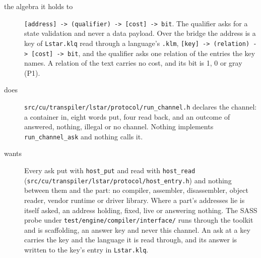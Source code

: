 \begin{description}
\item[{the algebra it holds to}] \texttt{[address] -\allowbreak{}> (qualifier) -\allowbreak{}> [cost] -\allowbreak{}> bit}. The qualifier asks for a state validation and never a data payload. Over the bridge the address is a key of \texttt{Lstar.\allowbreak{}klq} read through a language's \texttt{.\allowbreak{}klm}, \texttt{[key] -\allowbreak{}> (relation) -\allowbreak{}> [cost] -\allowbreak{}> bit}, and the qualifier asks one relation of the entries the key names. A relation of the text carries no cost, and its bit is 1, 0 or gray (P1).
\item[{does}] \texttt{src/\allowbreak{}cu/\allowbreak{}transpiler/\allowbreak{}lstar/\allowbreak{}protocol/\allowbreak{}run\_\allowbreak{}channel.\allowbreak{}h} declares the channel: a container in, eight words put, four read back, and an outcome of answered, nothing, illegal or no channel. Nothing implements \texttt{run\_\allowbreak{}channel\_\allowbreak{}ask} and nothing calls it.
\item[{wants}] Every ask put with \texttt{host\_\allowbreak{}put} and read with \texttt{host\_\allowbreak{}read} (\texttt{src/\allowbreak{}cu/\allowbreak{}transpiler/\allowbreak{}lstar/\allowbreak{}protocol/\allowbreak{}host\_\allowbreak{}entry.\allowbreak{}h}) and nothing between them and the part: no compiler, assembler, disassembler, object reader, vendor runtime or driver library. Where a part's addresses lie is itself asked, an address holding, fixed, live or answering nothing. The SASS probe under \texttt{test/\allowbreak{}engine/\allowbreak{}compiler/\allowbreak{}interface/\allowbreak{}} runs through the toolkit and is scaffolding, an answer key and never this channel. An ask at a key carries the key and the language it is read through, and its answer is written to the key's entry in \texttt{Lstar.\allowbreak{}klq}.

\end{description}
